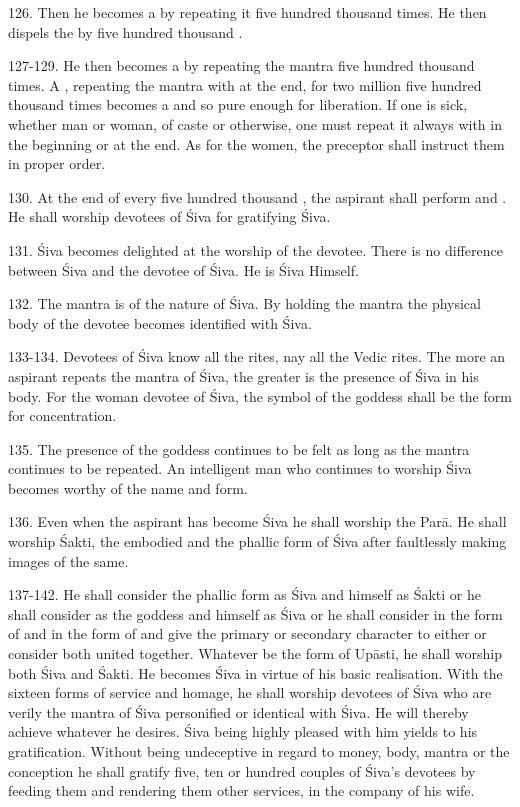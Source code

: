 126. Then he becomes a  by repeating it five hundred
thousand times. He then dispels the  by five hundred thousand
.

127-129. He then becomes a  by repeating the mantra five
hundred thousand times. A , repeating the mantra with  at
the end, for two million five hundred thousand times becomes
a  and so pure enough for liberation. If one is sick, whether
man or woman, of  caste or otherwise, one must repeat it always
with  in the beginning or at the end. As for the women, the preceptor
shall instruct them in proper order.

130. At the end of every five hundred thousand , the aspirant shall
perform  and . He shall worship devotees of Śiva
for gratifying Śiva.

131. Śiva becomes delighted at the worship of the devotee. There is no
difference between Śiva and the devotee of Śiva. He is Śiva Himself.

132. The mantra is of the nature of Śiva. By holding the mantra the physical
body of the devotee becomes identified with Śiva.

133-134. Devotees of Śiva know all the rites, nay all the Vedic rites. The more
an aspirant repeats the mantra of Śiva, the greater is the presence of Śiva in
his body. For the woman devotee of Śiva, the symbol of the goddess shall be
the form for concentration.

135. The presence of the goddess continues to be felt as long as the mantra
continues to be repeated. An intelligent man who continues to worship Śiva
becomes worthy of the name and form.

136. Even when the aspirant has become Śiva he shall worship the Parā. He shall
worship Śakti, the embodied and the phallic form of Śiva after faultlessly
making images of the same.

137-142. He shall consider the phallic form as Śiva and himself as Śakti or he
shall consider  as the goddess and himself as Śiva or he shall
consider  in the form of  and  in the form of
 and give the primary or secondary character to either or consider
both united together. Whatever be the form of Upāsti, he shall worship both Śiva
and Śakti. He becomes Śiva in virtue of his basic realisation. With the sixteen
forms of service and homage, he shall worship devotees of Śiva who are verily
the mantra of Śiva personified or identical with Śiva. He will thereby achieve
whatever he desires. Śiva being highly pleased with him yields to his
gratification. Without being undeceptive in regard to money, body, mantra or
the conception he shall gratify five, ten or hundred couples of Śiva’s devotees
by feeding them and rendering them other services, in the company of his wife.

